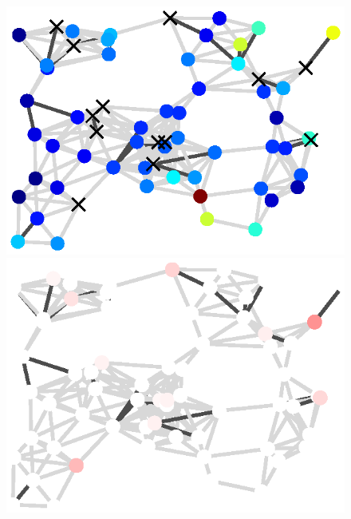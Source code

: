 \begin{figure}[t]
    \begin{center}
        \begin{minipage}{0.95\textwidth}
            \centering
            \begin{minipage}[t]{0.17\textwidth}
                \centering
                \includegraphics[width=\linewidth]{figures/true_and_observed/observed_signal}
            \end{minipage}\hspace{0.3em}
            \begin{minipage}[t]{0.17\textwidth}
                \centering
                \includegraphics[width=\linewidth]{figures/residual_plot/glr}

\end{minipage}
\end{minipage}
\end{center}
\end{figure}
